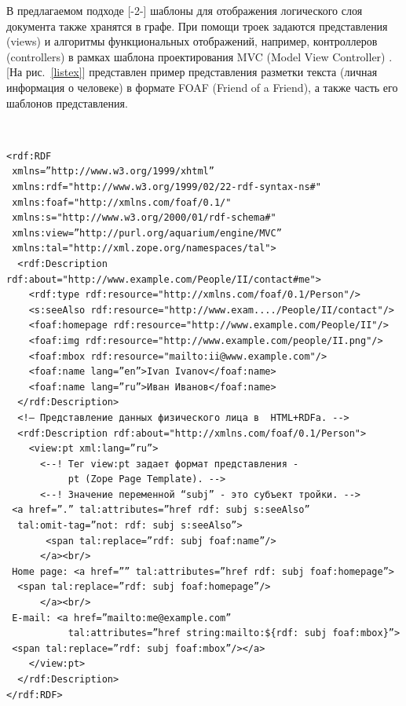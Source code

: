 \documentclass[utf8]{../IncArticle}
\newcommand{\e}[2][fcolor]{\textcolor{pcolor}{[}\textcolor{#1}{#2}\textcolor{pcolor}{]}}
\begin{document}
В предлагаемом подходе [-2-] шаблоны для отображения логического слоя
документа также хранятся в графе.  При помощи троек задаются
представления (views) и алгоритмы функциональных отображений,
например, контроллеров (controllers) в рамках шаблона проектирования
MVC (Model View Controller) \cite{b2:5}.  \e{На рис.~\ref{listex}}
представлен пример представления разметки текста (личная информация о
человеке) в формате FOAF (Friend of a Friend), а также часть его
шаблонов представления.

\begingroup%
\tt%
\begin{verbatim}
<rdf:RDF
 xmlns=”http://www.w3.org/1999/xhtml”
 xmlns:rdf="http://www.w3.org/1999/02/22-rdf-syntax-ns#"
 xmlns:foaf="http://xmlns.com/foaf/0.1/"
 xmlns:s="http://www.w3.org/2000/01/rdf-schema#"
 xmlns:view=”http://purl.org/aquarium/engine/MVC”
 xmlns:tal="http://xml.zope.org/namespaces/tal">
  <rdf:Description rdf:about="http://www.example.com/People/II/contact#me">
    <rdf:type rdf:resource="http://xmlns.com/foaf/0.1/Person"/>
    <s:seeAlso rdf:resource="http://www.exam..../People/II/contact"/>
    <foaf:homepage rdf:resource="http://www.example.com/People/II"/>
    <foaf:img rdf:resource="http://www.example.com/people/II.png"/>
    <foaf:mbox rdf:resource="mailto:ii@www.example.com"/>
    <foaf:name lang=”en”>Ivan Ivanov</foaf:name>
    <foaf:name lang=”ru”>Иван Иванов</foaf:name>
  </rdf:Description>
  <!— Представление данных физического лица в  HTML+RDFa. -->
  <rdf:Description rdf:about="http://xmlns.com/foaf/0.1/Person">
    <view:pt xml:lang=”ru”>
      <--! Тег view:pt задает формат представления -
           pt (Zope Page Template). -->
      <--! Значение переменной “subj” - это субъект тройки. -->
 <a href=”.” tal:attributes=”href rdf: subj s:seeAlso”
  tal:omit-tag=”not: rdf: subj s:seeAlso”>
       <span tal:replace=”rdf: subj foaf:name”/>
      </a><br/>
 Home page: <a href=”” tal:attributes=”href rdf: subj foaf:homepage”>
  <span tal:replace=”rdf: subj foaf:homepage”/>
      </a><br/>
 E-mail: <a href=”mailto:me@example.com”
           tal:attributes=”href string:mailto:${rdf: subj foaf:mbox}”>
 <span tal:replace=”rdf: subj foaf:mbox”/></a>
    </view:pt>
  </rdf:Description>
</rdf:RDF>
\end{verbatim}%
\endgroup
\end{document}
